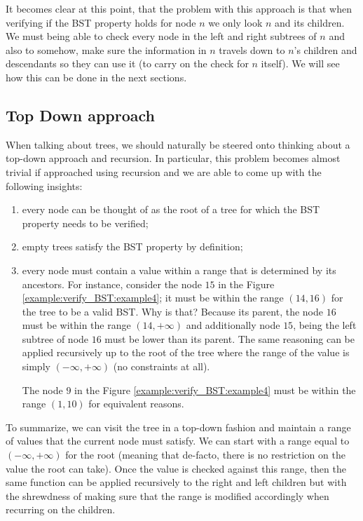 It becomes clear at this point, that the problem with this approach is that when verifying if the BST property holds for node $n$ we only look $n$ and its children. We must being able to check every node in the left and right subtrees of $n$ and also to somehow, make sure the information in $n$ travels down to $n$'s children and descendants so they can use it (to carry on the check for $n$ itself).
We will see how this can be done in the next sections.

\subsection{Top Down approach}
\label{verify_BST:sec:topdown}
When talking about trees, we should naturally be steered onto thinking about a top-down approach and recursion. 
In particular, this problem becomes almost trivial if approached using recursion and we are able to come up with the following insights:
\begin{enumerate}
	\item every node can be thought of as the root of a tree for which the BST property needs to be verified;
	\item empty trees satisfy the BST property by definition;
	\item every node must contain a value within a range that is determined by its ancestors. For instance, consider the node $15$ in the Figure \ref{example:verify_BST:example4}; it must be within the range $(14,16)$ for the tree to be a valid BST. Why is that? Because its parent, the node $16$ must be within the range $(14,+\infty)$ and additionally node $15$, being the left subtree of node $16$ must be lower than its parent. 
	The same reasoning can be applied recursively up to the root of the tree where the range of the value is simply $(-\infty, +\infty)$ (no constraints at all). 

	The node $9$ in the Figure \ref{example:verify_BST:example4} must be within the range $(1,10)$ for equivalent reasons.
\end{enumerate}

To summarize, we can visit the tree in a top-down fashion and maintain a range of values that the current node must satisfy. We can start with a range equal to $(-\infty, +\infty)$ for the root (meaning that de-facto, there is no restriction on the value the root can take).
Once the value is checked against this range, then the same function can be applied recursively to the right and left children but with the shrewdness of making sure that the range is modified accordingly when recurring on the children. 

